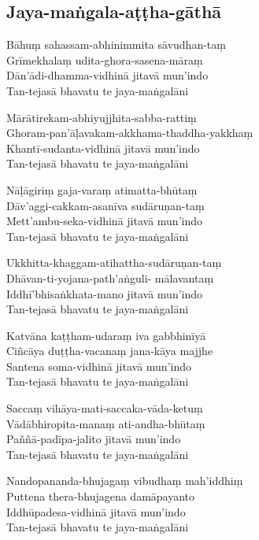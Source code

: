 
\enlargethispage{\baselineskip}

\subsection{Jaya-maṅgala-aṭṭha-gāthā}
\label{bahum}


\begin{paritta}
Bāhuṃ sahassam-abhinimmita sāvudhan-taṃ\\
Grīmekhalaṃ udita-ghora-sasena-māraṃ\\
Dān'ādi-dhamma-vidhinā jitavā mun'indo\\
Tan-tejasā bhavatu te jaya-maṅgalāni

Mārātirekam-abhiyujjhita-sabba-rattiṃ\\
Ghoram-pan'āḷavakam-akkhama-thaddha-yakkhaṃ\\
Khantī-sudanta-vidhinā jitavā mun'indo\\
Tan-tejasā bhavatu te jaya-maṅgalāni

Nāḷāgiriṃ gaja-varaṃ atimatta-bhūtaṃ\\
Dāv'aggi-cakkam-asanīva sudāruṇan-taṃ\\
Mett'ambu-seka-vidhinā jitavā mun'indo\\
Tan-tejasā bhavatu te jaya-maṅgalāni

Ukkhitta-khaggam-atihattha-sudāruṇan-taṃ\\
Dhāvan-ti-yojana-path'aṅguli- mālavantaṃ\\
Iddhī'bhisaṅkhata-mano jitavā mun'indo\\
Tan-tejasā bhavatu te jaya-maṅgalāni

Katvāna kaṭṭham-udaraṃ iva gabbhinīyā\\
Ciñcāya duṭṭha-vacanaṃ jana-kāya majjhe\\
Santena soma-vidhinā jitavā mun'indo\\
Tan-tejasā bhavatu te jaya-maṅgalāni

Saccaṃ vihāya-mati-saccaka-vāda-ketuṃ\\
Vādābhiropita-manaṃ ati-andha-bhūtaṃ\\
Paññā-padīpa-jalito jitavā mun'indo\\
Tan-tejasā bhavatu te jaya-maṅgalāni

Nandopananda-bhujagaṃ vibudhaṃ mah'iddhiṃ\\
Puttena thera-bhujagena damāpayanto\\
Iddhūpadesa-vidhinā jitavā mun'indo\\
Tan-tejasā bhavatu te jaya-maṅgalāni


\end{paritta}

